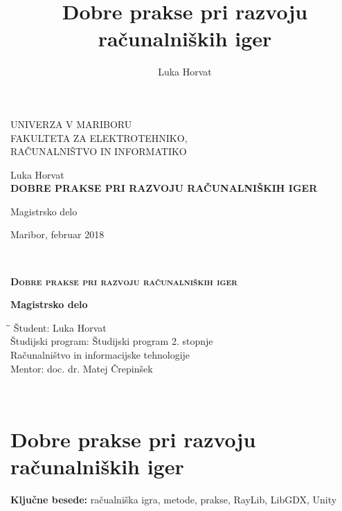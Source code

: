 \documentclass[12pt,a4paper,twoside]{book}
\author{Luka Horvat}
\title{Dobre prakse pri razvoju računalniških iger}
\begin{document}
	
\thispagestyle{empty} 
\begin{center}
	{\large 
		UNIVERZA V MARIBORU\\
		FAKULTETA ZA ELEKTROTEHNIKO,\\
		RAČUNALNIŠTVO IN INFORMATIKO\\
	}
	
	\vspace{\fill}
	{\LARGE Luka Horvat}\\
	
	\vspace{1cm}
	\textsc{\textbf{\LARGE DOBRE PRAKSE PRI RAZVOJU RAČUNALNIŠKIH IGER\\}}
	
	\vspace{1cm}
	{\LARGE Magistrsko delo}
	
	\vfill
	{\Large Maribor, februar 2018}
	\newpage
\end{center}

\ \thispagestyle{empty}
\newpage

\thispagestyle{empty} 
\begin{center}	
	\vspace*{\fill}
	\textsc{\textbf{\LARGE
			Dobre prakse pri razvoju računalniških iger\\
	}}
	{\large\textbf{Magistrsko delo\\}
		
	}
	\vspace{\fill}
	\begin{tabbing}
		\hspace*{4cm}\=\hspace*{3cm}\= \kill
		Študent: \> Luka Horvat\\
		Študijski program: \> Študijski program 2. stopnje\\
		\>Računalništvo in informacijske tehnologije\\
		Mentor: \> doc. dr. Matej Črepinšek
	\end{tabbing}
\end{center}
\newpage

\ \thispagestyle{empty}
\newpage

\chapter*{Dobre prakse pri razvoju računalniških iger}\thispagestyle{fancy}
\setcounter{page}{1}
\textbf{Ključne besede:} račualniška igra, metode, prakse, RayLib, LibGDX, Unity
\end{document}
